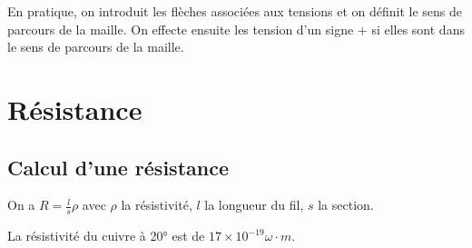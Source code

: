 \documentclass[french]{yLectureNote}
\begin{document}
En pratique, on introduit les flèches associées aux tensions et on définit le sens de parcours de la maille. On effecte ensuite les tension d'un signe $+$ si elles sont dans le sens de parcours de la maille.
%
%
%

\section{Résistance}
\subsection{Calcul d'une résistance}
\begin{definition}[Résistance]
On a \(R = \frac{l}{s}\rho\) avec \(\rho\) la résistivité, \(l\) la longueur du fil, \(s\) la section.
\end{definition}
La résistivité du cuivre à 20° est de $17\times 10^{-19} \omega\cdot m$.
\end{document}
